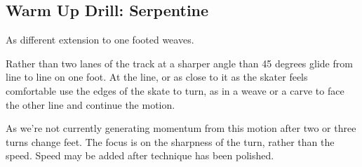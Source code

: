 \subsection*{Warm Up Drill: Serpentine} 

As different extension to one footed weaves.

Rather than two lanes of the track at a sharper angle than 45 degrees glide from line to line on one foot. At the line, or as close to it as the skater feels comfortable use the edges of the skate to turn, as in a weave or a carve to face the other line and continue the motion.   

As we're not currently generating momentum from this motion after two or three turns change feet. 
The focus is on the sharpness of the turn, rather than the speed. 
Speed may be added after technique has been polished.
